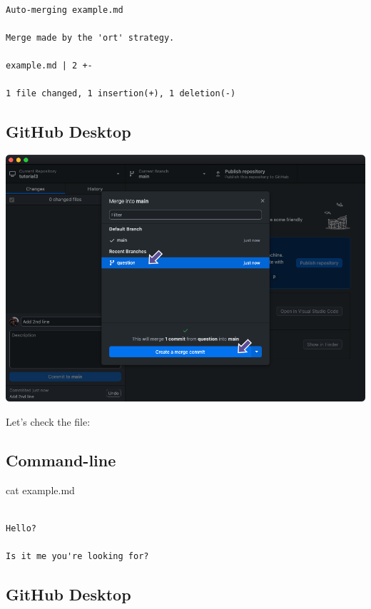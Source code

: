\documentclass[
  letterpaper,
  DIV=11,
  numbers=noendperiod]{scrartcl}
\newenvironment{Shaded}{\begin{snugshade}}{\end{snugshade}}
\newcommand{\FunctionTok}[1]{\textcolor[rgb]{0.28,0.35,0.67}{#1}}
\newcommand{\NormalTok}[1]{\textcolor[rgb]{0.00,0.23,0.31}{#1}}
\begin{document}
\begin{verbatim}

Auto-merging example.md

Merge made by the 'ort' strategy.

example.md | 2 +-

1 file changed, 1 insertion(+), 1 deletion(-)
\end{verbatim}

\subsection{GitHub Desktop}

\includegraphics{images/image44.png}

Let's check the file:

\subsection{Command-line}

\begin{Shaded}
\begin{Highlighting}[]
\FunctionTok{cat}\NormalTok{ example.md}
\end{Highlighting}
\end{Shaded}

\begin{verbatim}

Hello?

Is it me you're looking for?
\end{verbatim}

\subsection{GitHub Desktop}
\end{document}
